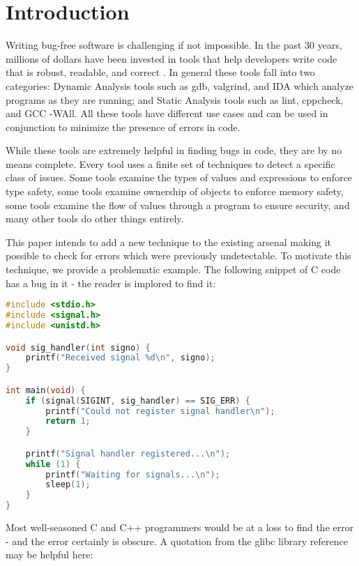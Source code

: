 \chapter{Introduction}

Writing bug-free software is challenging if not impossible.  In the past 30 years, millions of dollars have been invested in tools that help developers write code that is robust, readable, and correct \cite{staticanal}.  In general these tools fall into two categories:  Dynamic Analysis tools such as gdb, valgrind, and IDA which analyze programs as they are running; and Static Analysis tools such as lint, cppcheck, and GCC -WAll.  All these tools have different use cases and can be used in conjunction to minimize the presence of errors in code.

While these tools are extremely helpful in finding bugs in code, they are by no means complete.  Every tool uses a finite set of techniques to detect a specific class of issues.  Some tools examine the types of values and expressions to enforce type safety\cite{staticanal}, some tools examine ownership of objects to enforce memory safety\cite{rust-is-dope}, some tools examine the flow of values through a program to ensure security\cite{jqual-inference}, and many other tools do other things entirely.  

This paper intends to add a new technique to the existing arsenal making it possible to check for errors which were previously undetectable.  To motivate this technique, we provide a problematic example.  The following snippet of C code has a bug in it - the reader is implored to find it:

\begin{minipage}[c]{0.95\textwidth}
\begin{lstlisting}[language=C]
#include <stdio.h>
#include <signal.h>
#include <unistd.h>

void sig_handler(int signo) {
    printf("Received signal %d\n", signo);
}

int main(void) {
    if (signal(SIGINT, sig_handler) == SIG_ERR) {
        printf("Could not register signal handler\n");
        return 1;
    }

    printf("Signal handler registered...\n");
    while (1) {
        printf("Waiting for signals...\n");
        sleep(1);
    }
}
\end{lstlisting}
\end{minipage}

Most well-seasoned C and C++ programmers would be at a loss to find the error - and the error certainly is obscure.  A quotation from the glibc library reference may be helpful here:


